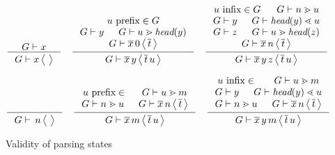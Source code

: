 \documentclass{article}
\begin{document}
\begin{figure}
  \[
  \inference{\stree{G}{x}}{\sstate{G}{x}{}}
  \quad
  \inference{
    \hasfix{u}{\prefix{}{}}{G} \\
    \stree{G}{y} & \sgd{G}{u}{\head{y}} \\
    \sqstate{G}{\seq{x}}{0}{\seq{t}}}
    {\sstate{G}{\seq{x}\,y}{\seq{t}\,u}}
  \quad
  \inference{
    \hasfix{u}{\infix{}{}}{G} & \sgd{G}{n}{u} \\
    \stree{G}{y} & \sld{G}{\head{y}}{u} \\
    \stree{G}{z} & \sgd{G}{u}{\head{z}} \\
    \sqstate{G}{\seq{x}}{n}{\seq{t}}}
    {\sstate{G}{\seq{x}\,y\,z}{\seq{t}\,u}}
  \]
  
  \[
  \inference{}{\sqstate{G}{}{n}{}}
  \quad
  \inference{
    \hasfix{u}{\prefix{}{}} & \sgd{G}{u}{m} \\
    \sgd{G}{n}{u} & \sqstate{G}{\seq{x}}{n}{\seq{t}}}
    {\sqstate{G}{\seq{x}}{m}{\seq{t}\,u}}
  \quad
  \inference{
    \hasfix{u}{\infix{}{}} & \sgd{G}{u}{m} \\
    \stree{G}{y} & \sld{G}{\head{y}}{u} \\
    \sgd{G}{n}{u} & \sqstate{G}{\seq{x}}{n}{\seq{t}}}
    {\sqstate{G}{\seq{x}\,y}{m}{\seq{t}\,u}}
  \]

\caption{Validity of parsing states}
\end{figure}
\end{document}
